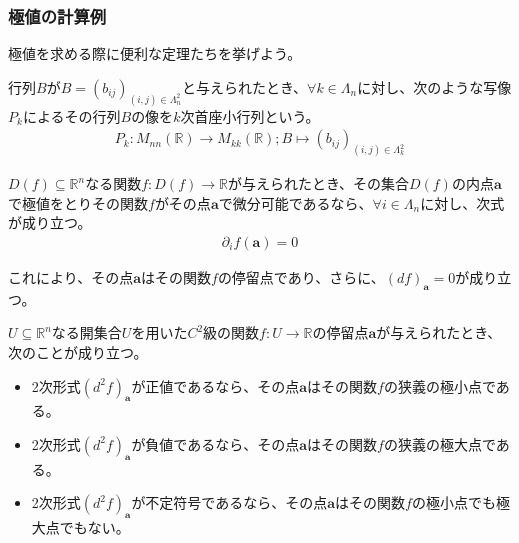 \documentclass[dvipdfmx]{jsarticle}
\begin{document}
\subsubsection{極値の計算例}%
極値を求める際に便利な定理たちを挙げよう。
\begin{dfn*}
行列$B$が$B = \left( b_{ij} \right)_{(i,j) \in \varLambda_{n}^{2}}$と与えられたとき、$\forall k \in \varLambda_{n}$に対し、次のような写像$P_{k}$によるその行列$B$の像を$k$次首座小行列という。
\begin{align*}
P_{k}:M_{nn}\left( \mathbb{R} \right) \rightarrow M_{kk}\left( \mathbb{R} \right);B \mapsto \left( b_{ij} \right)_{(i,j) \in \varLambda_{k}^{2}}
\end{align*}
\end{dfn*}
\begin{thm*}
$D(f) \subseteq \mathbb{R}^{n}$なる関数$f:D(f) \rightarrow \mathbb{R}$が与えられたとき、その集合$D(f)の内点\mathbf{a}$で極値をとりその関数$f$がその点$\mathbf{a}$で微分可能であるなら、$\forall i \in \varLambda_{n}$に対し、次式が成り立つ。
\begin{align*}
\partial_{i}f\left( \mathbf{a} \right) = 0
\end{align*}\par
これにより、その点$\mathbf{a}$はその関数$f$の停留点であり、さらに、$(df)_{\mathbf{a}} = 0$が成り立つ。
\end{thm*}
\begin{thm*}
$U \subseteq \mathbb{R}^{n}$なる開集合$U$を用いた$C^{2}$級の関数$f:U \rightarrow \mathbb{R}$の停留点$\mathbf{a}$が与えられたとき、次のことが成り立つ。
\begin{itemize}
\item
  2次形式$\left( d^{2}f \right)_{\mathbf{a}}$が正値であるなら、その点$\mathbf{a}$はその関数$f$の狭義の極小点である。
\item
  2次形式$\left( d^{2}f \right)_{\mathbf{a}}$が負値であるなら、その点$\mathbf{a}$はその関数$f$の狭義の極大点である。
\item
  2次形式$\left( d^{2}f \right)_{\mathbf{a}}$が不定符号であるなら、その点$\mathbf{a}$はその関数$f$の極小点でも極大点でもない。
\end{itemize}
\end{thm*}
\end{document}
